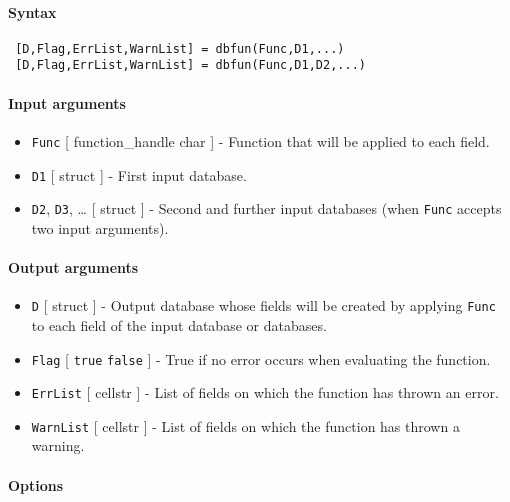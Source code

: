 


	\paragraph{Syntax}
 
 \begin{verbatim}
 [D,Flag,ErrList,WarnList] = dbfun(Func,D1,...)
 [D,Flag,ErrList,WarnList] = dbfun(Func,D1,D2,...)
 \end{verbatim}
 
 \paragraph{Input arguments}
 
 \begin{itemize}
 \item
   \texttt{Func} {[} function\_handle \textbar{} char {]} - Function that
   will be applied to each field.
 \item
   \texttt{D1} {[} struct {]} - First input database.
 \item
   \texttt{D2}, \texttt{D3}, \ldots{} {[} struct {]} - Second and further
   input databases (when \texttt{Func} accepts two input arguments).
 \end{itemize}
 
 \paragraph{Output arguments}
 
 \begin{itemize}
 \item
   \texttt{D} {[} struct {]} - Output database whose fields will be
   created by applying \texttt{Func} to each field of the input database
   or databases.
 \item
   \texttt{Flag} {[} \texttt{true} \textbar{} \texttt{false} {]} - True
   if no error occurs when evaluating the function.
 \item
   \texttt{ErrList} {[} cellstr {]} - List of fields on which the
   function has thrown an error.
 \item
   \texttt{WarnList} {[} cellstr {]} - List of fields on which the
   function has thrown a warning.
 \end{itemize}
 
 \paragraph{Options}
 

